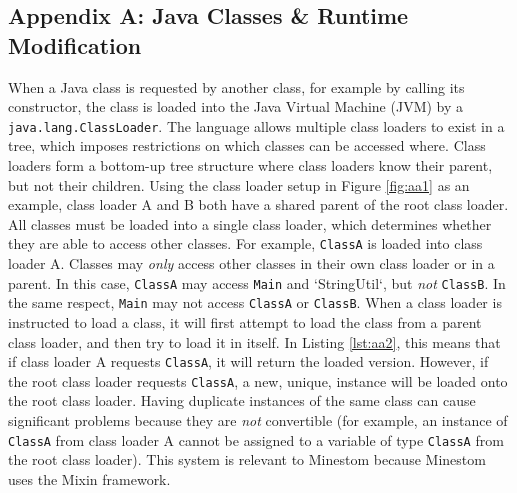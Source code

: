 \documentclass[12pt]{article}
\def\code#1{\texttt{#1}}
\begin{document}
\printbibliography

\begin{onehalfspacing}

\section{Appendix A: Java Classes \& Runtime Modification}

When a Java class is requested by another class, for example by calling
its constructor, the class is loaded into the Java Virtual Machine (JVM)
by a \code{java.lang.ClassLoader}. The language allows multiple class loaders
to exist in a tree, which imposes restrictions on which classes can be
accessed where. Class loaders form a bottom-up tree structure where
class loaders know their parent, but not their children. Using the class
loader setup in Figure \ref{fig:aa1} as an example, class loader A and B both
have a shared parent of the root class loader. All classes must be
loaded into a single class loader, which determines whether they are
able to access other classes. For example, \code{ClassA} is loaded into class
loader A. Classes may \emph{only} access other classes in their own class
loader or in a parent. In this case, \code{ClassA} may access \code{Main} and
`StringUtil`, but \emph{not} \code{ClassB}. In the same respect, \code{Main} may 
not access \code{ClassA} or \code{ClassB}. When a class loader is instructed to 
load a class, it will first attempt to load the class from a parent class
loader, and then try to load it in itself. In Listing \ref{lst:aa2}, this means
that if class loader A requests \code{ClassA}, it will return the loaded
version. However, if the root class loader requests \code{ClassA}, a new,
unique, instance will be loaded onto the root class loader. Having
duplicate instances of the same class can cause significant problems
because they are \emph{not} convertible (for example, an instance of
\code{ClassA} from class loader A cannot be assigned to a variable of type
\code{ClassA} from the root class loader). This system is relevant to
Minestom because Minestom uses the Mixin framework.


\end{onehalfspacing}
\end{document}

